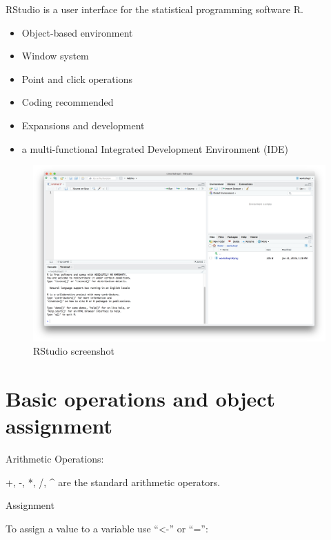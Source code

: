 \documentclass[]{book}
\providecommand{\tightlist}{%
  \setlength{\itemsep}{0pt}\setlength{\parskip}{0pt}}
\begin{document}
RStudio is a user interface for the statistical programming software R.

\begin{itemize}
\tightlist
\item
  Object-based environment
\item
  Window system
\item
  Point and click operations
\item
  Coding recommended\\
\item
  Expansions and development
\item
  a multi-functional Integrated Development Environment (IDE)
\end{itemize}

\begin{figure}
\includegraphics[width=1\linewidth]{RStudioscreenshot} \caption{RStudio screenshot}\label{fig:Rstudioscreenshot}
\end{figure}

\hypertarget{basic-operations-and-object-assignment}{%
\section{Basic operations and object assignment}\label{basic-operations-and-object-assignment}}

Arithmetic Operations:

+, -, *, /, \^{} are the standard arithmetic operators.

Assignment

To assign a value to a variable use ``\textless-'' or ``='':
\end{document}
